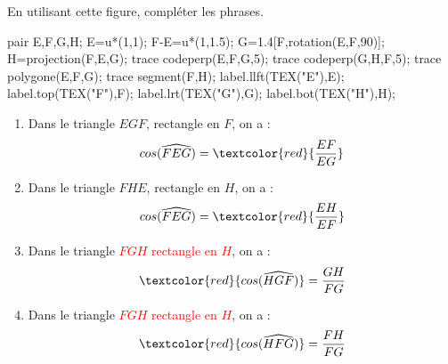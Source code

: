     En utilisant cette figure, compléter les phrases.

    \begin{Geometrie}
        pair E,F,G,H;
        E=u*(1,1);
        F-E=u*(1,1.5);
        G=1.4[F,rotation(E,F,90)];
        H=projection(F,E,G);
        trace codeperp(E,F,G,5);
        trace codeperp(G,H,F,5);
        trace polygone(E,F,G);
        trace segment(F,H);
        label.llft(TEX("E"),E);
        label.top(TEX("F"),F);
        label.lrt(TEX("G"),G);
        label.bot(TEX("H"),H);
    \end{Geometrie}

    \begin{enumerate}
        \item Dans le triangle $EGF$, rectangle en $F$, on a : $$cos(\widehat{FEG})=\textcolor{red}{\dfrac{EF}{EG}}$$
        \item Dans le triangle $FHE$, rectangle en $H$, on a : $$cos(\widehat{FEG})=\textcolor{red}{\dfrac{EH}{EF}}$$
        \item Dans le triangle \textcolor{red}{$FGH$ rectangle en $H$}, on a : $$\textcolor{red}{cos(\widehat{HGF})}=\dfrac{GH}{FG}$$
    \end{enumerate}
    \Coupe
    \begin{enumerate}
        \setcounter{enumi}{3}
        \item Dans le triangle \textcolor{red}{$FGH$ rectangle en $H$}, on a : $$\textcolor{red}{cos(\widehat{HFG})}=\dfrac{FH}{FG}$$
    \end{enumerate}
